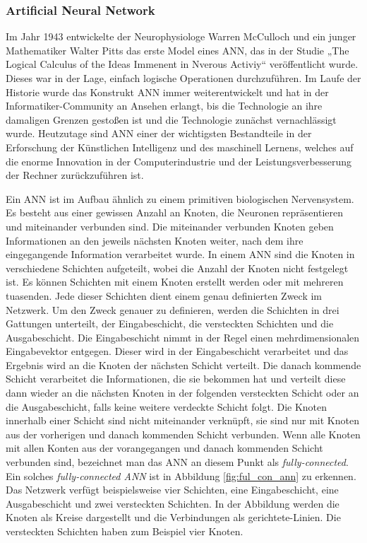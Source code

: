 \subsubsection{Artificial Neural Network}
Im Jahr 1943 entwickelte der Neurophysiologe Warren McCulloch und ein junger Mathematiker Walter Pitts das erste Model eines ANN, das in der Studie „The Logical Calculus of the Ideas Immenent in Nverous Activiy“ veröffentlicht wurde. Dieses war in der Lage, einfach logische Operationen durchzuführen.
Im Laufe der Historie wurde das Konstrukt ANN immer weiterentwickelt und hat in der Informatiker-Community an Ansehen erlangt, bis die Technologie an ihre damaligen Grenzen gestoßen ist und die Technologie zunächst vernachlässigt wurde.
Heutzutage sind ANN einer der wichtigsten Bestandteile in der Erforschung der Künstlichen Intelligenz und des maschinell Lernens, welches auf die enorme Innovation in der Computerindustrie und der Leistungsverbesserung der Rechner zurückzuführen ist. \cite*{10.1007/978-3-319-45378-1_1}

Ein ANN ist im Aufbau ähnlich zu einem primitiven biologischen Nervensystem. Es besteht aus einer gewissen Anzahl an Knoten, die Neuronen repräsentieren und miteinander verbunden sind. Die miteinander verbunden Knoten geben Informationen an den jeweils nächsten Knoten weiter, nach dem ihre eingegangende Information verarbeitet wurde.
In einem ANN sind die Knoten in verschiedene Schichten aufgeteilt, wobei die Anzahl der Knoten nicht festgelegt ist. Es können Schichten mit einem Knoten erstellt werden oder mit mehreren tuasenden. Jede dieser Schichten dient einem genau definierten Zweck im Netzwerk. Um den Zweck genauer zu definieren, werden die Schichten in drei Gattungen unterteilt, der Eingabeschicht, die versteckten Schichten und die Ausgabeschicht. Die Eingabeschicht nimmt in der Regel einen mehrdimensionalen Eingabevektor entgegen. Dieser wird in der Eingabeschicht verarbeitet und das Ergebnis wird an die Knoten der nächsten Schicht verteilt. Die danach kommende Schicht verarbeitet die Informationen, die sie bekommen hat und verteilt diese dann wieder an die nächsten Knoten in der folgenden versteckten Schicht oder an die Ausgabeschicht, falls keine weitere verdeckte Schicht folgt.
Die Knoten innerhalb einer Schicht sind nicht miteinander verknüpft, sie sind nur mit Knoten aus der vorherigen und danach kommenden Schicht verbunden. Wenn alle Knoten mit allen Konten aus der vorangegangen und danach kommenden Schicht verbunden sind, bezeichnet man das ANN an diesem Punkt als \textit{fully-connected}. Ein solches \textit{fully-connected ANN} ist in Abbildung \ref{fig:ful_con_ann} zu erkennen. Das Netzwerk verfügt beispielsweise vier Schichten, eine Eingabeschicht, eine Ausgabeschicht und zwei versteckten Schichten. In der Abbildung werden die Knoten als Kreise dargestellt und die Verbindungen als gerichtete-Linien. Die versteckten Schichten haben zum Beispiel vier Knoten.
\cite*{Keiron2015}

